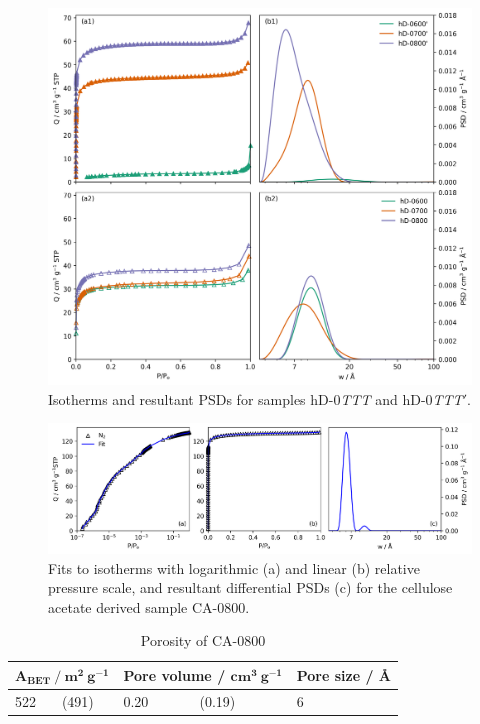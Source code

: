 \begin{figure}[h]
    \centering
    \includegraphics[width=\columnwidth, keepaspectratio]{4-cbs/figs/0TTT_n2_isotherms.png}
    \caption{Isotherms and resultant PSDs for samples hD-0\textit{TTT} and hD-0\textit{TTT}$'$.}
    \label{fig:0TTT_psdiso}
\end{figure}


\begin{figure}[h]
    \centering
    \includegraphics[width=\columnwidth, keepaspectratio]{4-cbs/figs/CA_iso_psd.png}
    \caption{Fits to  isotherms with logarithmic (a) and linear (b) relative pressure scale, and resultant differential PSDs (c) for the cellulose acetate derived sample CA-0800.}
    \label{fig:CA_psdiso}
\end{figure}

\clearpage
\begin{table}[h]
    \centering
    \caption{Porosity of CA-0800}
    \label{tb:CA_porosity}
    \begin{tabularx}{0.9\textwidth}{llllll}
    \toprule
        \multicolumn{2}{l}{$\mathbf{A_{BET}\ /\ m^2\ g^{-1}}$}  & \multicolumn{2}{l}{\textbf{Pore volume} / $\mathbf{cm^3\ g^{-1}}$} & \multicolumn{2}{l}{\textbf{Pore size / \AA}} \\
    \midrule
    522 & (491) & 0.20 & (0.19) & 6 \\
    \bottomrule
    \end{tabularx}
\end{table}

